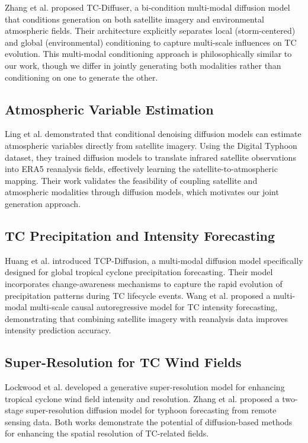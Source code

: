 \documentclass[12pt, a4paper]{article}
\begin{document}
Zhang et al. \cite{zhang2025tcdiffuser} proposed TC-Diffuser, a bi-condition multi-modal diffusion model that conditions generation on both satellite imagery and environmental atmospheric fields. Their architecture explicitly separates local (storm-centered) and global (environmental) conditioning to capture multi-scale influences on TC evolution. This multi-modal conditioning approach is philosophically similar to our work, though we differ in jointly generating both modalities rather than conditioning on one to generate the other.

\subsection{Atmospheric Variable Estimation}

Ling et al. \cite{ling2024estimating} demonstrated that conditional denoising diffusion models can estimate atmospheric variables directly from satellite imagery. Using the Digital Typhoon dataset, they trained diffusion models to translate infrared satellite observations into ERA5 reanalysis fields, effectively learning the satellite-to-atmospheric mapping. Their work validates the feasibility of coupling satellite and atmospheric modalities through diffusion models, which motivates our joint generation approach.

\subsection{TC Precipitation and Intensity Forecasting}

Huang et al. \cite{huang2024tcp} introduced TCP-Diffusion, a multi-modal diffusion model specifically designed for global tropical cyclone precipitation forecasting. Their model incorporates change-awareness mechanisms to capture the rapid evolution of precipitation patterns during TC lifecycle events. Wang et al. \cite{wang2024global} proposed a multi-modal multi-scale causal autoregressive model for TC intensity forecasting, demonstrating that combining satellite imagery with reanalysis data improves intensity prediction accuracy.

\subsection{Super-Resolution for TC Wind Fields}

Lockwood et al. \cite{lockwood2024trsd} developed a generative super-resolution model for enhancing tropical cyclone wind field intensity and resolution. Zhang et al. \cite{zhang2025tsrd} proposed a two-stage super-resolution diffusion model for typhoon forecasting from remote sensing data. Both works demonstrate the potential of diffusion-based methods for enhancing the spatial resolution of TC-related fields.
\end{document}
